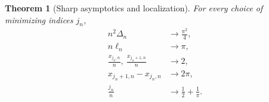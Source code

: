 \documentclass[11pt]{article}
\numberwithin{equation}{section}
\newtheorem{theorem}{Theorem}[section]
\theoremstyle{definition}
\theoremstyle{remark}
\begin{document}
\begin{theorem}[Sharp asymptotics and localization]\label{thm:large-order}
For every choice of minimizing indices $j_n$,
\begin{align}
 n^2\Delta_n&\longrightarrow\frac{\pi^2}{4},
 \label{asy:eq:value}\\
 n\ell_n&\longrightarrow\pi,
 \label{asy:eq:log}\\
 \frac{x_{j_n,n}}n,\ 
 \frac{x_{j_n+1,n}}n&\longrightarrow2,
 \label{asy:eq:location}\\
 x_{j_n+1,n}-x_{j_n,n}&\longrightarrow2\pi,
 \label{asy:eq:absolute}\\
 \frac{j_n}{n}&\longrightarrow\frac12+\frac1\pi.
 \label{asy:eq:index}
\end{align}
\end{theorem}
\end{document}
